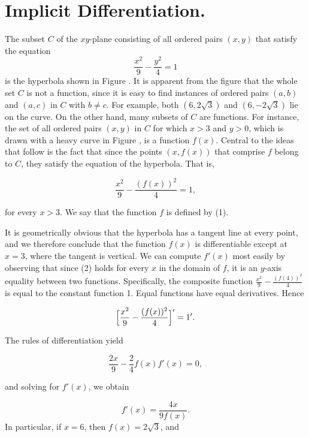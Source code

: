 \section{Implicit Differentiation.} \label{sec 1.9}
The subset $C$ of the $xy$-plane consisting of all ordered pairs $(x, y)$ that satisfy the equation
\begin{equation}
\frac{x^2}{9} - \frac{y^2}{4} = 1               
\label{eq1.9.1}
\end{equation}
is the hyperbola shown in Figure .
It is apparent from the figure that the whole set $C$ is not a function, since
it is easy to find instances of ordered pairs $(a, b)$ and $(a, c)$ in $C$ with
$b \neq c$. For example, both $(6, 2\sqrt3)$ and $(6, - 2\sqrt3)$ lie on the
curve. On the other hand, many subsets of $C$ are functions. For instance, the
set of all ordered pairs $(x, y)$ in $C$ for which $x > 3$ and $y > 0$, which
is drawn with a heavy curve in Figure , is a function $f(x)$.
Central to the ideas that follow is the fact that since the points $(x, f(x))$
that comprise
$f$ belong to $C$, they satisfy the equation of the hyperbola. That is, 

\begin{equation}
\frac{x^2}{9} - \frac{ (f(x))^2}{4} = 1, 
\label{eq1.9.2}
\end{equation}

for every $x > 3$. We say that the function $f$ is defined  by (1).

It is geometrically obvious that the hyperbola has a tangent line at every point, and we therefore conclude that the function $f(x)$ is differentiable except at $x = 3$, where the tangent is vertical. We can compute $f'(x)$ most easily by observing that since (2) holds for every $x$ in the domain of $f$, it is an $y$-axis equality between two functions. Specifically, the composite function $\frac{x^2}{9} - \frac{(f(4))^2}{4}$ is equal to the constant function 1. Equal functions have equal derivatives. Hence


$$
\Bigl[\frac{x^2}{9} - \frac{(f(x))^2}{4} \Bigr]' =  1'.
$$

The rules of differentiation yield

$$
\frac{2x}{9} -\frac{2}{4} f(x)f'(x) = 0 , 
$$

and solving for $f'(x)$, we obtain

\begin{equation}
f'(x) = \frac{4x}{9f(x)}.
\label{eq1.9.3}
\end{equation}
In particular, if $x = 6$, then $f(x) = 2\sqrt3$, and

